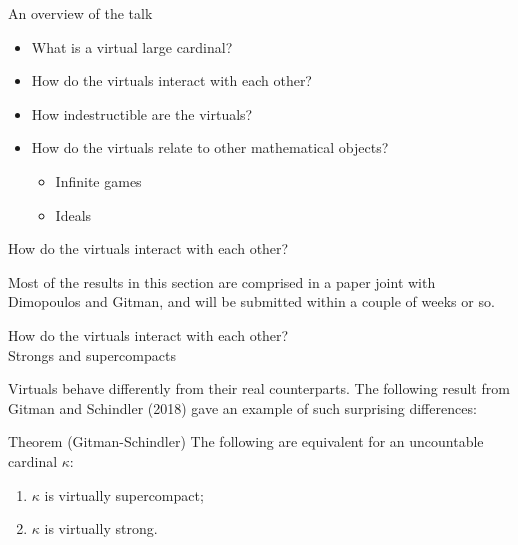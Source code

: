 \documentclass{beamer}
\begin{document}
\begin{frame}{An overview of the talk}
  \begin{itemize}
    \item What is a virtual large cardinal?
    \item<alert@+> How do the virtuals interact with each other?
    \item How indestructible are the virtuals?
    \item How do the virtuals relate to other mathematical objects?
      \begin{itemize}
        \item Infinite games
        \item Ideals
      \end{itemize}
  \end{itemize}
\end{frame}

\begin{frame}{How do the virtuals interact with each other?}

  Most of the results in this section are comprised in a paper joint with \alert{Dimopoulos} and \alert{Gitman}, and will be submitted within a couple of weeks or so.

\end{frame}

\begin{frame}{How do the virtuals interact with each other? \\
              {\small Strongs and supercompacts}}

  Virtuals behave differently from their real counterparts. The following result from Gitman and Schindler (2018) gave an example of such surprising differences:

  \begin{block}{Theorem (Gitman-Schindler)}
    The following are equivalent for an uncountable cardinal $\kappa$:
    \begin{enumerate}
      \item $\kappa$ is virtually supercompact;
      \item $\kappa$ is virtually strong.
    \end{enumerate}
  \end{block}

\end{frame}
\end{document}
